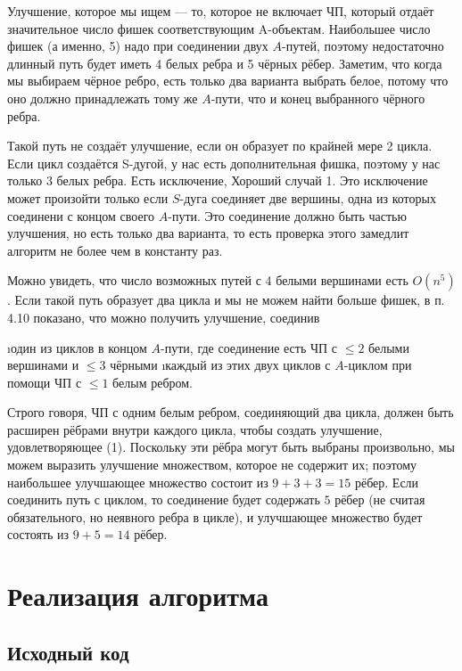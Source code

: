 \begin{proofstar}
Улучшение, которое мы ищем --- то, которое не включает ЧП, который отдаёт значительное число фишек соответствующим A-объектам. Наибольшее число фишек (а именно, 5) надо при соединении двух $A$-путей, поэтому недостаточно длинный путь будет иметь 4 белых ребра и 5 чёрных рёбер. Заметим, что  когда мы выбираем чёрное ребро, есть только два варианта выбрать белое, потому что оно должно принадлежать тому же $A$-пути, что и конец выбранного чёрного ребра.

Такой путь не создаёт улучшение, если он образует по крайней мере 2 цикла. Если цикл создаётся S-дугой, у нас есть дополнительная фишка, поэтому у нас только $3$ белых ребра. Есть исключение, Хороший случай 1. Это исключение может произойти только если $S$-дуга соединяет две вершины, одна из которых соединени с концом своего $A$-пути. Это соединение должно быть частью улучшения, но есть только два варианта, то есть проверка этого замедлит алгоритм не более чем в константу раз.

Можно увидеть, что число возможных путей с 4 белыми вершинами есть $O(n^5)$. Если такой путь образует два цикла и мы не можем найти больше фишек, в п. 4.10 показано, что можно получить улучшение, соединив 
\begin{enumerate}
\i один из циклов в концом $A$-пути, где соединение есть ЧП с $\le 2$ белыми вершинами и $\le 3$ чёрными
\i каждый из этих двух циклов с $A$-циклом при помощи ЧП с $\le 1$ белым ребром.
\end{enumerate}

Строго говоря, ЧП с одним белым ребром, соединяющий два цикла, должен быть расширен рёбрами внутри каждого цикла, чтобы создать улучшение, удовлетворяющее (1). Поскольку эти рёбра могут быть выбраны произвольно, мы можем выразить улучшение множеством, которое не содержит их; поэтому наибольшее улучшающее множество состоит из $9+3+3=15$ рёбер. Если соединить путь с циклом, то соединение будет содержать $5$ рёбер (не считая обязательного, но неявного ребра в цикле), и улучшающее множество будет состоять из $9+5=14$ рёбер.
\end{proofstar}

\section{Реализация алгоритма}

\subsection{Исходный код}
\inputminted{python}{k-improv.py}
